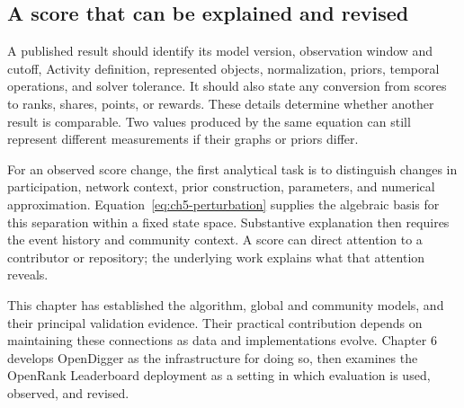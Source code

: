 \subsection{A score that can be explained and revised}
A published result should identify its model version, observation window and cutoff, Activity definition, represented objects, normalization, priors, temporal operations, and solver tolerance. It should also state any conversion from scores to ranks, shares, points, or rewards. These details determine whether another result is comparable. Two values produced by the same equation can still represent different measurements if their graphs or priors differ.

For an observed score change, the first analytical task is to distinguish changes in participation, network context, prior construction, parameters, and numerical approximation. Equation~\ref{eq:ch5-perturbation} supplies the algebraic basis for this separation within a fixed state space. Substantive explanation then requires the event history and community context. A score can direct attention to a contributor or repository; the underlying work explains what that attention reveals.

This chapter has established the algorithm, global and community models, and their principal validation evidence. Their practical contribution depends on maintaining these connections as data and implementations evolve. Chapter 6 develops OpenDigger as the infrastructure for doing so, then examines the OpenRank Leaderboard deployment as a setting in which evaluation is used, observed, and revised.
